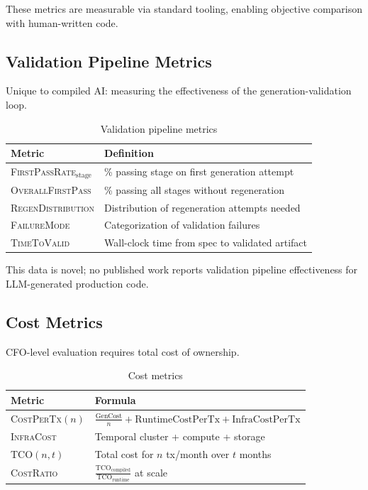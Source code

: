\documentclass[11pt]{article}
\newcommand{\metric}[1]{\textsc{#1}}
\begin{document}
These metrics are measurable via standard tooling, enabling objective comparison with human-written code.

\subsection{Validation Pipeline Metrics}

Unique to compiled AI: measuring the effectiveness of the generation-validation loop.

\begin{table}[ht]
\centering
\caption{Validation pipeline metrics}
\label{tab:validation-metrics}
\begin{tabular}{p{4cm}p{8cm}}
\toprule
Metric & Definition \\
\midrule
\metric{FirstPassRate}$_{\text{stage}}$ & \% passing stage on first generation attempt \\
\metric{OverallFirstPass} & \% passing all stages without regeneration \\
\metric{RegenDistribution} & Distribution of regeneration attempts needed \\
\metric{FailureMode} & Categorization of validation failures \\
\metric{TimeToValid} & Wall-clock time from spec to validated artifact \\
\bottomrule
\end{tabular}
\end{table}

This data is novel; no published work reports validation pipeline effectiveness for LLM-generated production code.

\subsection{Cost Metrics}

CFO-level evaluation requires total cost of ownership.

\begin{table}[ht]
\centering
\caption{Cost metrics}
\label{tab:cost-metrics}
\begin{tabular}{p{3.5cm}p{8.5cm}}
\toprule
Metric & Formula \\
\midrule
\metric{CostPerTx}$(n)$ & $\frac{\text{GenCost}}{n} + \text{RuntimeCostPerTx} + \text{InfraCostPerTx}$ \\
\metric{InfraCost} & Temporal cluster + compute + storage \\
\metric{TCO}$(n, t)$ & Total cost for $n$ tx/month over $t$ months \\
\metric{CostRatio} & $\frac{\text{TCO}_{\text{compiled}}}{\text{TCO}_{\text{runtime}}}$ at scale \\
\bottomrule
\end{tabular}
\end{table}
\end{document}
